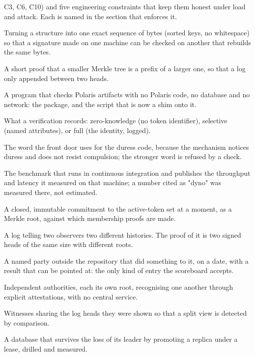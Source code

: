 \begin{description}
    C3, C6, C10) and five engineering constraints that keep them honest under load and attack. Each
    is named in the section that enforces it.
  \item[Canonicalisation.] Turning a structure into one exact sequence of bytes (sorted keys, no
    whitespace) so that a signature made on one machine can be checked on another that rebuilds the
    same bytes.
  \item[Consistency proof.] A short proof that a smaller Merkle tree is a prefix of a larger one, so
    that a log only appended between two heads.
  \item[Detached verifier.] A program that checks Polaris artifacts with no Polaris code, no database
    and no network: the  package, and the script that is now a shim onto it.
  \item[Disclosure level.] What a verification records: zero-knowledge (no token identifier),
    selective (named attributes), or full (the identity, logged).
  \item[Duress-aware.] The word the front door uses for the duress code, because the mechanism
    notices duress and does not resist compulsion; the stronger word is refused by a check.
  \item[Dyno.] The benchmark that runs in continuous integration and publishes the throughput and latency
    it measured on that machine; a number cited as "dyno" was measured there, not estimated.
  \item[Epoch.] A closed, immutable commitment to the active-token set at a moment, as a Merkle root,
    against which membership proofs are made.
  \item[Equivocation.] A log telling two observers two different histories. The proof of it is two
    signed heads of the same size with different roots.
  \item[External noun.] A named party outside the repository that did something to it, on a date,
    with a result that can be pointed at: the only kind of entry the scoreboard accepts.
  \item[Federation.] Independent authorities, each its own root, recognising one another through
    explicit attestations, with no central service.
  \item[Gossip.] Witnesses sharing the log heads they were shown so that a split view is detected by
    comparison.
  \item[High availability.] A database that survives the loss of its leader by promoting a replica
    under a lease, drilled and measured.

\end{description}
